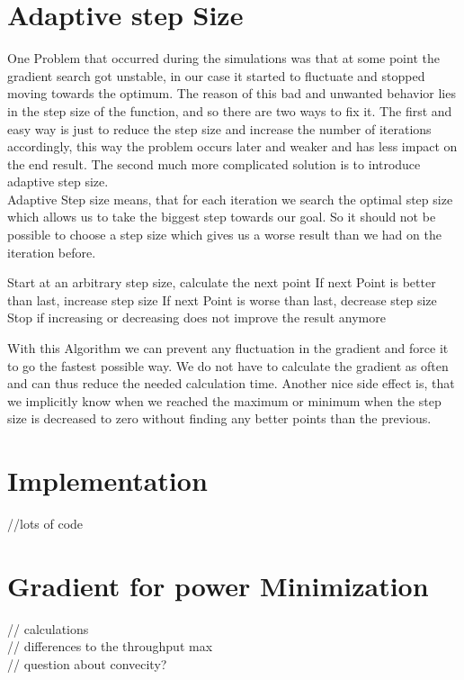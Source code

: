 \documentclass[9pt,draft]{report}
\begin{document}
\section{Adaptive step Size}
One Problem that occurred during the simulations was that at some point the gradient search got unstable, in our case it started to fluctuate and stopped moving towards the optimum. The reason of this bad and unwanted behavior lies in the step size of the function, and so there are two ways to fix it. The first and easy way is just to reduce the step size and increase the number of iterations accordingly, this way the problem occurs later and weaker and has less impact on the end result. The second much more complicated solution is to introduce adaptive step size.\\
Adaptive Step size means, that for each iteration we search the optimal step size which allows us to take the biggest step towards our goal. So it should not be possible to choose a step size which gives us a worse result than we had on the iteration before.
\begin{algorithm}
	Start at an arbitrary step size, calculate the next point
	If next Point is better than last, increase step size
	If next Point is worse than last, decrease step size
	Stop if increasing or decreasing does not improve the result anymore
\end{algorithm}
With this Algorithm we can prevent any fluctuation in the gradient and force it to go the fastest possible way. We do not have to calculate the gradient as often and can thus reduce the needed calculation time. Another nice side effect is, that we implicitly know when we reached the maximum or minimum when the step size is decreased to zero without finding any better points than the previous.

\section{Implementation}
//lots of code\\

\section{Gradient for power Minimization}
// calculations\\
// differences to the throughput max\\
// question about convecity?\\
\end{document}
